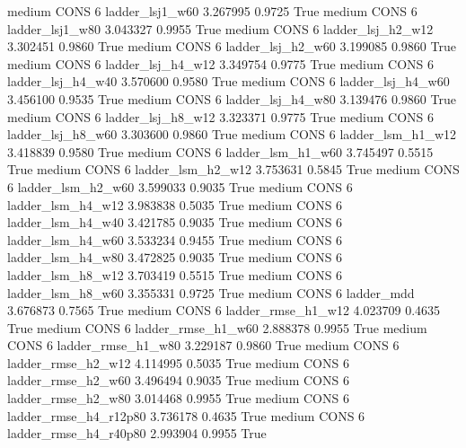     medium     CONS                 6        ladder_lsj1_w60   3.267995      0.9725    True
    medium     CONS                 6        ladder_lsj1_w80   3.043327      0.9955    True
    medium     CONS                 6      ladder_lsj_h2_w12   3.302451      0.9860    True
    medium     CONS                 6      ladder_lsj_h2_w60   3.199085      0.9860    True
    medium     CONS                 6      ladder_lsj_h4_w12   3.349754      0.9775    True
    medium     CONS                 6      ladder_lsj_h4_w40   3.570600      0.9580    True
    medium     CONS                 6      ladder_lsj_h4_w60   3.456100      0.9535    True
    medium     CONS                 6      ladder_lsj_h4_w80   3.139476      0.9860    True
    medium     CONS                 6      ladder_lsj_h8_w12   3.323371      0.9775    True
    medium     CONS                 6      ladder_lsj_h8_w60   3.303600      0.9860    True
    medium     CONS                 6      ladder_lsm_h1_w12   3.418839      0.9580    True
    medium     CONS                 6      ladder_lsm_h1_w60   3.745497      0.5515    True
    medium     CONS                 6      ladder_lsm_h2_w12   3.753631      0.5845    True
    medium     CONS                 6      ladder_lsm_h2_w60   3.599033      0.9035    True
    medium     CONS                 6      ladder_lsm_h4_w12   3.983838      0.5035    True
    medium     CONS                 6      ladder_lsm_h4_w40   3.421785      0.9035    True
    medium     CONS                 6      ladder_lsm_h4_w60   3.533234      0.9455    True
    medium     CONS                 6      ladder_lsm_h4_w80   3.472825      0.9035    True
    medium     CONS                 6      ladder_lsm_h8_w12   3.703419      0.5515    True
    medium     CONS                 6      ladder_lsm_h8_w60   3.355331      0.9725    True
    medium     CONS                 6             ladder_mdd   3.676873      0.7565    True
    medium     CONS                 6     ladder_rmse_h1_w12   4.023709      0.4635    True
    medium     CONS                 6     ladder_rmse_h1_w60   2.888378      0.9955    True
    medium     CONS                 6     ladder_rmse_h1_w80   3.229187      0.9860    True
    medium     CONS                 6     ladder_rmse_h2_w12   4.114995      0.5035    True
    medium     CONS                 6     ladder_rmse_h2_w60   3.496494      0.9035    True
    medium     CONS                 6     ladder_rmse_h2_w80   3.014468      0.9955    True
    medium     CONS                 6  ladder_rmse_h4_r12p80   3.736178      0.4635    True
    medium     CONS                 6  ladder_rmse_h4_r40p80   2.993904      0.9955    True
